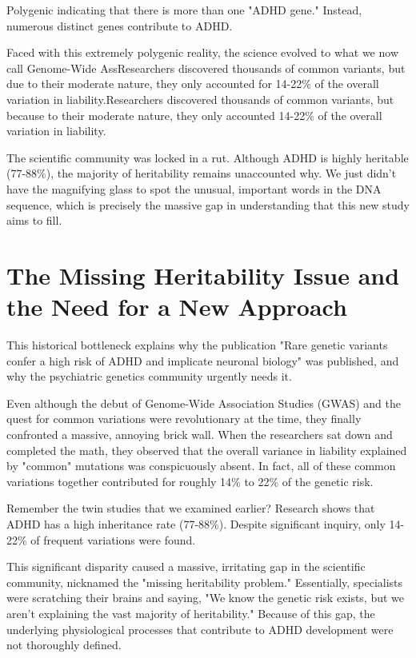 Polygenic indicating that there is more than one "ADHD gene." Instead, numerous distinct genes contribute to ADHD.  

Faced with this extremely polygenic reality, the science evolved to what we now call Genome-Wide AssResearchers discovered thousands of common variants, but due to their moderate nature, they only accounted for 14-22\% of the overall variation in liability.Researchers discovered thousands of common variants, but because to their moderate nature, they only accounted 14-22\% of the overall variation in liability.

The scientific community was locked in a rut.  Although ADHD is highly heritable (77-88\%), the majority of heritability remains unaccounted why.  We just didn't have the magnifying glass to spot the unusual, important words in the DNA sequence, which is precisely the massive gap in understanding that this new study aims to fill.  

\section{The Missing Heritability Issue and the Need for a New Approach} 

This historical bottleneck explains why the publication "Rare genetic variants confer a high risk of ADHD and implicate neuronal biology" was published, and why the psychiatric genetics community urgently needs it.  

Even although the debut of Genome-Wide Association Studies (GWAS) and the quest for common variations were revolutionary at the time, they finally confronted a massive, annoying brick wall. 
When the researchers sat down and completed the math, they observed that the overall variance in liability explained by "common" mutations was conspicuously absent.  In fact, all of these common variations together contributed for roughly 14\% to 22\% of the genetic risk.  

Remember the twin studies that we examined earlier?  Research shows that ADHD has a high inheritance rate (77-88\%).  Despite significant inquiry, only 14-22\% of frequent variations were found.  

This significant disparity caused a massive, irritating gap in the scientific community, nicknamed the "missing heritability problem." Essentially, specialists were scratching their brains and saying, "We know the genetic risk exists, but we aren't explaining the vast majority of heritability." 
Because of this gap, the underlying physiological processes that contribute to ADHD development were not thoroughly defined.  

